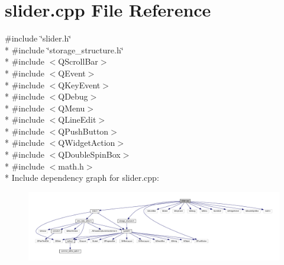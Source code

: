 \hypertarget{a00046}{\section{slider.\+cpp File Reference}
\label{a00046}
}
{\ttfamily \#include \char`\"{}slider.\+h\char`\"{}}\\*
{\ttfamily \#include \char`\"{}storage\+\_\+structure.\+h\char`\"{}}\\*
{\ttfamily \#include $<$Q\+Scroll\+Bar$>$}\\*
{\ttfamily \#include $<$Q\+Event$>$}\\*
{\ttfamily \#include $<$Q\+Key\+Event$>$}\\*
{\ttfamily \#include $<$Q\+Debug$>$}\\*
{\ttfamily \#include $<$Q\+Menu$>$}\\*
{\ttfamily \#include $<$Q\+Line\+Edit$>$}\\*
{\ttfamily \#include $<$Q\+Push\+Button$>$}\\*
{\ttfamily \#include $<$Q\+Widget\+Action$>$}\\*
{\ttfamily \#include $<$Q\+Double\+Spin\+Box$>$}\\*
{\ttfamily \#include $<$math.\+h$>$}\\*
Include dependency graph for slider.\+cpp\+:
\nopagebreak
\begin{figure}[H]
\begin{center}
\leavevmode
\includegraphics[width=350pt]{de/d79/a00203}
\end{center}
\end{figure}
